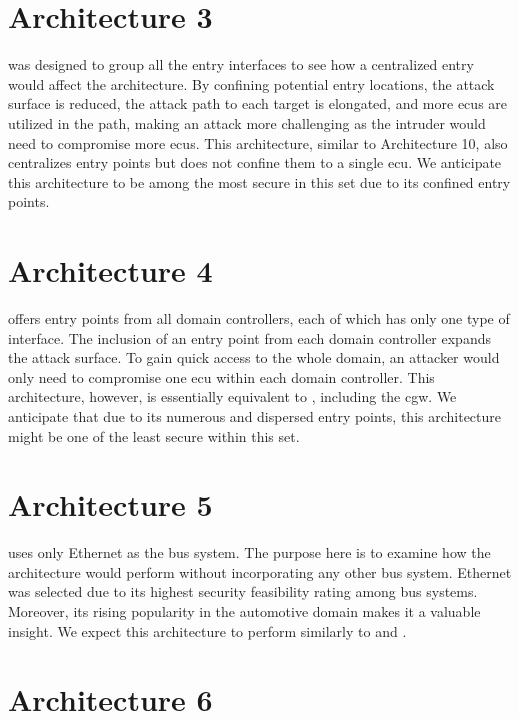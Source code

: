 \section{Architecture 3}
\label{subsec:arch3}

 was designed to group all the entry interfaces to see how a centralized entry would affect the architecture. 
By confining potential entry locations, the attack surface is reduced, the attack path to each target is elongated, 
and more \acrshort{ecu}s are utilized in the path, making an attack more challenging as the intruder would need to compromise more \acrshort{ecu}s. 
This architecture, similar to Architecture 10, also centralizes entry points but does not confine them to a single \acrshort{ecu}.
We anticipate this architecture to be among the most secure in this set due to its confined entry points.
\section{Architecture 4}
\label{subsec:arch4}

 offers entry points from all domain controllers, each of which has only one type of interface. 
The inclusion of an entry point from each domain controller expands the attack surface. 
To gain quick access to the whole domain, an attacker would only need to compromise one \acrshort{ecu} within each domain controller. 
This architecture, however, is essentially equivalent to , including the \acrshort{cgw}. 
We anticipate that due to its numerous and dispersed entry points, this architecture might be one of the least secure within this set.
\section{Architecture 5}
\label{subsec:arch5}

 uses only Ethernet as the bus system. 
The purpose here is to examine how the architecture would perform without incorporating any other bus system. 
Ethernet was selected due to its highest security feasibility rating among bus systems. 
Moreover, its rising popularity in the automotive domain makes it a valuable insight.
We expect this architecture to perform similarly to  and .

\section{Architecture 6}
\label{subsec:arch6}

